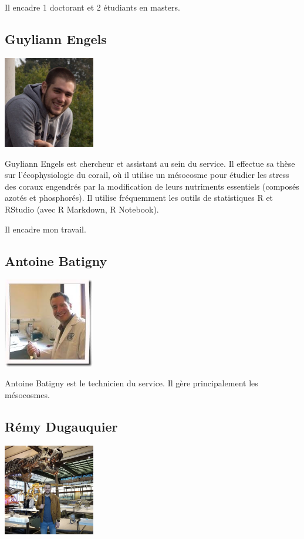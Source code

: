 \documentclass[]{report}
\begin{document}
Il encadre 1 doctorant et 2 étudiants en masters.

\subsection{Guyliann Engels}\label{guyliann-engels}

\includegraphics[width=4.00000cm]{../image/Guyliann.jpg}

Guyliann Engels est chercheur et assistant au sein du service. Il
effectue sa thèse sur l'écophysiologie du corail, où il utilise un
mésocosme pour étudier les stress des coraux engendrés par la
modification de leurs nutriments essentiels (composés azotés et
phosphorés). Il utilise fréquemment les outils de statistiques R et
RStudio (avec R Markdown, R Notebook).

Il encadre mon travail.

\subsection{Antoine Batigny}\label{antoine-batigny}

\includegraphics[width=4.00000cm]{../image/antoine2.jpg}

Antoine Batigny est le technicien du service. Il gère principalement les
mésocosmes.

\subsection{Rémy Dugauquier}\label{remy-dugauquier}

\includegraphics[width=4.00000cm]{../image/remy.jpg}
\end{document}
